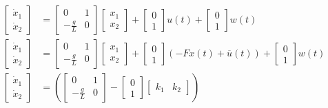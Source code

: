 \documentclass{article}
\begin{document}
\begin{align*}
    \begin{bmatrix} \dot{x}_1 \\ \dot{x}_2 \end{bmatrix} & =
    \begin{bmatrix} 0 & 1 \\ -\frac{g}{L} & 0 \end{bmatrix}
    \begin{bmatrix} x_1 \\ x_2 \end{bmatrix} +
    \begin{bmatrix} 0 \\ 1 \end{bmatrix} u(t) +
    \begin{bmatrix} 0 \\ 1 \end{bmatrix}w(t)                        \\ %
    \begin{bmatrix} \dot{x}_1 \\ \dot{x}_2 \end{bmatrix} & =
    \begin{bmatrix} 0 & 1 \\ -\frac{g}{L} & 0 \end{bmatrix}
    \begin{bmatrix} x_1 \\ x_2 \end{bmatrix} +
    \begin{bmatrix} 0 \\ 1 \end{bmatrix} (-Fx(t)+\overline{u}(t)) +
    \begin{bmatrix} 0 \\ 1 \end{bmatrix}w(t)                        \\ %
    \begin{bmatrix} \dot{x}_1 \\ \dot{x}_2 \end{bmatrix} & = \left(
    \begin{bmatrix} 0 & 1 \\ -\frac{g}{L} & 0 \end{bmatrix} - \begin{bmatrix} 0 \\ 1\end{bmatrix} \begin{bmatrix} k_1 & k_2 \end{bmatrix}\right)

\end{align*}
\end{document}

